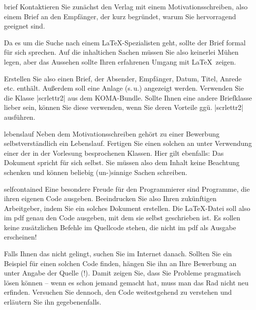 \documentclass[
	blatt=10,
	ausgabe=18.\,06.\,2010,
	rückgabe=25.\,06.\,2010
]{lcourse-hd}
\begin{document}
\begin{exercise}[
  name=Motivationsschreiben,
  punkte=5,
  abgabe = Quelltext per Mail{,} das fertige Dokument als Ausdruck.
]{brief}
Kontaktieren Sie zunächst den Verlag mit einem Motivationsschreiben, also einem Brief an den Empfänger, der kurz begründet, warum Sie hervorragend geeignet sind.

Da es um die Suche nach einem \LaTeX-Spezialisten geht, sollte der Brief formal für sich sprechen. Auf die inhaltichen Sachen müssen Sie also keinerlei Mühen legen, aber das Aussehen sollte Ihren erfahrenen Umgang mit \LaTeX\ zeigen.

Erstellen Sie also einen Brief, der Absender, Empfänger, Datum, Titel, Anrede etc. enthält. Außerdem soll eine Anlage (s.\,u.) angezeigt werden. Verwenden Sie die Klasse |scrlettr2| aus dem KOMA-Bundle. Sollte Ihnen eine andere Briefklasse lieber sein, können Sie diese verwenden, wenn Sie deren Vorteile ggü. |scrlettr2| ausführen.
\end{exercise}

\begin{exercise}[
  name=Lebenslauf,
  punkte=5,
  abgabe = Quelltext per Mail{,} das fertige Dokument als Ausdruck.
]{lebenslauf}
Neben dem Motivationsschreiben gehört zu einer Bewerbung selbstverständlich ein Lebenslauf. Fertigen Sie einen solchen an unter Verwendung einer der in der Vorlesung besprochenen Klassen. Hier gilt ebenfalls: Das Dokument spricht für sich selbst. Sie müssen also dem Inhalt keine Beachtung schenken und können beliebig (un-)sinnige Sachen schreiben.
\end{exercise}

\begin{expertexercise}[
  name=Ich bin ich.,
  abgabe= Quelltext per Mail.]
{selfcontained}
Eine besondere Freude für den Programmierer sind Programme, die ihren eigenen Code ausgeben. Beeindrucken Sie also Ihren zukünftigen Arbeitgeber, indem Sie ein solches Dokument erstellen. Die \LaTeX-Datei soll also im pdf genau den Code ausgeben, mit dem sie selbst geschrieben ist. Es sollen keine zusätzlichen Befehle im Quellcode stehen, die nicht im pdf als Ausgabe erscheinen!

Falls Ihnen das nicht gelingt, suchen Sie im Internet danach. Sollten Sie ein Beispiel für einen solchen Code finden, hängen Sie ihn an Ihre Bewerbung an unter Angabe der Quelle (!). Damit zeigen Sie, dass Sie Probleme pragmatisch lösen können – wenn es schon jemand gemacht hat, muss man das Rad nicht neu erfinden. Versuchen Sie dennoch, den Code weitestgehend zu verstehen und erläutern Sie ihn gegebenenfalls.

\end{expertexercise}
\end{document}
